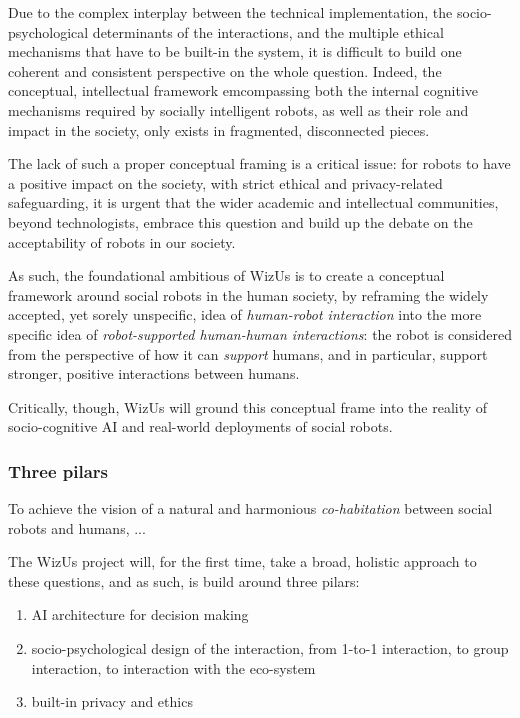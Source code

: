 \documentclass[11pt]{article}
\newcommand{\project}{WizUs\xspace}
\begin{document}
Due to the complex interplay between the technical implementation, the
socio-psychological determinants of the interactions, and the multiple ethical
mechanisms that have to be built-in the system, it is difficult to build one
coherent and consistent perspective on the whole question. Indeed, the
conceptual, intellectual framework emcompassing both the internal cognitive
mechanisms required by socially intelligent robots, as well as their role and
impact in the society, only exists in fragmented, disconnected pieces.

The lack of such a proper conceptual framing is a critical issue: for robots to
have a positive impact on the society, with strict ethical and privacy-related
safeguarding, it is urgent that the wider academic and intellectual communities,
beyond technologists, embrace this question and build up the debate on the
acceptability of robots in our society.

As such, the foundational ambitious of \project is to create a conceptual
framework around social robots in the human society, by reframing the widely
accepted, yet sorely unspecific, idea of \emph{human-robot interaction} into the
more specific idea of \emph{robot-supported human-human interactions}: the robot
is considered from the perspective of how it can \emph{support} humans, and in
particular, support stronger, positive interactions between humans.

Critically, though, \project will ground this conceptual frame into the reality
of socio-cognitive AI and real-world deployments of social robots.


\subsubsection{Three pilars}

To achieve the vision of a natural and harmonious \emph{co-habitation} between
social robots and humans, ...

The \project project will, for the first time, take a broad, holistic approach
to these questions, and as such, is build around three pilars:

\begin{enumerate}
    \item AI architecture for decision making
    \item socio-psychological design of the interaction, from 1-to-1
        interaction, to group interaction, to interaction with the eco-system
    \item built-in privacy and ethics
\end{enumerate}
\end{document}
